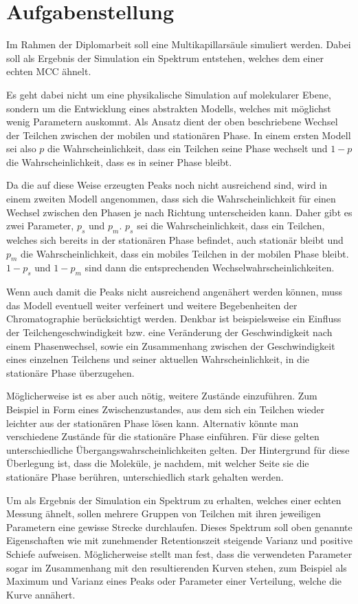 \documentclass[a4paper,11pt]{article}
\begin{document}
\section{Aufgabenstellung}
Im Rahmen der Diplomarbeit soll eine Multikapillarsäule simuliert werden. Dabei soll als Ergebnis der Simulation ein Spektrum entstehen, welches dem einer echten MCC ähnelt.

Es geht dabei nicht um eine physikalische Simulation auf molekularer Ebene, sondern um die Entwicklung eines abstrakten Modells, welches mit möglichst wenig Parametern auskommt. Als Ansatz dient der oben beschriebene Wechsel der Teilchen zwischen der mobilen und stationären Phase. In einem ersten Modell sei also $p$ die Wahrscheinlichkeit, dass ein Teilchen seine Phase wechselt und $1-p$ die Wahrscheinlichkeit, dass es in seiner Phase bleibt. 

Da die auf diese Weise erzeugten Peaks noch nicht ausreichend sind, wird in einem zweiten Modell angenommen, dass sich die Wahrscheinlichkeit für einen Wechsel zwischen den Phasen je nach Richtung unterscheiden kann. Daher gibt es zwei Parameter, $p_s$ und $p_m$. $p_s$ sei die Wahrscheinlichkeit, dass ein Teilchen, welches sich bereits in der stationären Phase befindet, auch stationär bleibt und $p_m$ die Wahrscheinlichkeit, dass ein mobiles Teilchen in der mobilen Phase bleibt. $1-p_s$ und $1-p_m$ sind dann die entsprechenden Wechselwahrscheinlichkeiten. 

Wenn auch damit die Peaks nicht ausreichend angenähert werden können, muss das Modell eventuell weiter verfeinert und weitere Begebenheiten der Chromatographie berücksichtigt werden. Denkbar ist beispielsweise ein Einfluss der Teilchengeschwindigkeit bzw. eine Veränderung der Geschwindigkeit nach einem Phasenwechsel, sowie ein Zusammenhang zwischen der Geschwindigkeit eines einzelnen Teilchens und seiner aktuellen Wahrscheinlichkeit, in die stationäre Phase überzugehen. 

Möglicherweise ist es aber auch nötig, weitere Zustände einzuführen. Zum Beispiel in Form eines Zwischenzustandes, aus dem sich ein Teilchen wieder leichter aus der stationären Phase lösen kann. Alternativ könnte man verschiedene Zustände für die stationäre Phase einführen. Für diese gelten unterschiedliche Übergangswahrscheinlichkeiten gelten. Der Hintergrund für diese Überlegung ist, dass die Moleküle, je nachdem, mit welcher Seite sie die stationäre Phase berühren, unterschiedlich stark gehalten werden.

Um als Ergebnis der Simulation ein Spektrum zu erhalten, welches einer echten Messung ähnelt, sollen mehrere Gruppen von Teilchen mit ihren jeweiligen Parametern eine gewisse Strecke durchlaufen. Dieses Spektrum soll oben genannte Eigenschaften wie mit zunehmender Retentionszeit steigende Varianz und positive Schiefe aufweisen. 
Möglicherweise stellt man fest, dass die verwendeten Parameter sogar im Zusammenhang mit den resultierenden Kurven stehen, zum Beispiel als Maximum und Varianz eines Peaks oder Parameter einer Verteilung, welche die Kurve annähert. 
\end{document}
